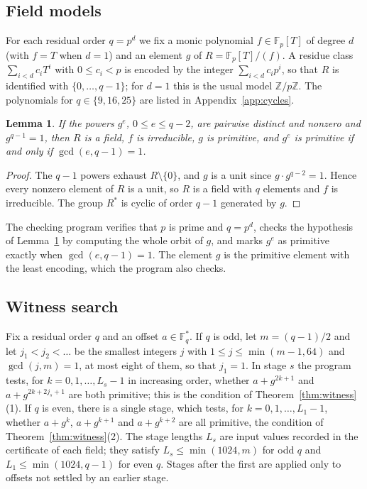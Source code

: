 \documentclass{amsart}
\newtheorem{lemma}[theorem]{Lemma}
\theoremstyle{remark}
\numberwithin{equation}{section}
\numberwithin{table}{section}
\newcommand{\F}{\mathbb{F}}
\begin{document}
\subsection{Field models}
For each residual order $q=p^{d}$ we fix a monic polynomial $f\in\F_p[T]$ of degree $d$ (with $f=T$ when $d=1$) and an element $g$ of $R=\F_p[T]/(f)$. A residue class $\sum_{i<d}c_iT^{i}$ with $0\le c_i<p$ is encoded by the integer $\sum_{i<d}c_ip^{i}$, so that $R$ is identified with $\{0,\dots,q-1\}$; for $d=1$ this is the usual model $\mathbb Z/p\mathbb Z$. The polynomials for $q\in\{9,16,25\}$ are listed in Appendix~\ref{app:cycles}.

\begin{lemma}\label{lem:model}
If the powers $g^{e}$, $0\le e\le q-2$, are pairwise distinct and nonzero and $g^{q-1}=1$, then $R$ is a field, $f$ is irreducible, $g$ is primitive, and $g^{e}$ is primitive if and only if $\gcd(e,q-1)=1$.
\end{lemma}

\begin{proof}
The $q-1$ powers exhaust $R\setminus\{0\}$, and $g$ is a unit since $g\cdot g^{q-2}=1$. Hence every nonzero element of $R$ is a unit, so $R$ is a field with $q$ elements and $f$ is irreducible. The group $R^{*}$ is cyclic of order $q-1$ generated by $g$.
\end{proof}

The checking program verifies that $p$ is prime and $q=p^{d}$, checks the hypothesis of Lemma~\ref{lem:model} by computing the whole orbit of $g$, and marks $g^{e}$ as primitive exactly when $\gcd(e,q-1)=1$. The element $g$ is the primitive element with the least encoding, which the program also checks.

\subsection{Witness search}
Fix a residual order $q$ and an offset $a\in\F_q^{*}$. If $q$ is odd, let $m=(q-1)/2$ and let $j_1<j_2<\dots$ be the smallest integers $j$ with $1\le j\le\min(m-1,64)$ and $\gcd(j,m)=1$, at most eight of them, so that $j_1=1$. In stage $s$ the program tests, for $k=0,1,\dots,L_s-1$ in increasing order, whether $a+g^{2k+1}$ and $a+g^{2k+2j_s+1}$ are both primitive; this is the condition of Theorem~\ref{thm:witness}(1). If $q$ is even, there is a single stage, which tests, for $k=0,1,\dots,L_1-1$, whether $a+g^{k}$, $a+g^{k+1}$ and $a+g^{k+2}$ are all primitive, the condition of Theorem~\ref{thm:witness}(2). The stage lengths $L_s$ are input values recorded in the certificate of each field; they satisfy $L_s\le\min(1024,m)$ for odd $q$ and $L_1\le\min(1024,q-1)$ for even $q$. Stages after the first are applied only to offsets not settled by an earlier stage.
\end{document}
